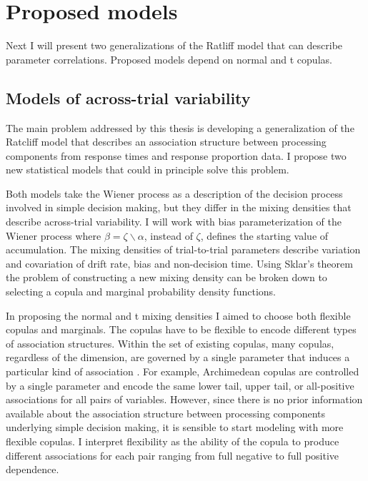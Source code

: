 \documentclass[12pt]{article}
\begin{document}
\section{Proposed models}

Next I will present two generalizations of the Ratliff model that can describe parameter correlations. Proposed models depend on normal and t copulas. 
\subsection{Models of across-trial variability}

The main problem addressed by this thesis is developing a generalization of the Ratcliff model that describes an association
structure between processing components from response times and
response proportion data. I propose two new statistical models that
could in principle solve this problem.

Both models take the Wiener process as a description of the decision
process involved in simple decision making, but they differ in the
mixing densities that describe across-trial variability. I will work
with bias parameterization of the Wiener process where $\beta = \zeta \backslash \alpha$, instead of $\zeta$, defines the starting value of accumulation. The
mixing densities of trial-to-trial parameters describe variation and covariation of drift rate, bias and non-decision time. Using Sklar's theorem the problem of
constructing a new mixing density can be broken down to
selecting a copula and marginal probability density functions.
    
In proposing the normal and t mixing densities I aimed to choose
both flexible copulas and marginals. 
The copulas have to be flexible to encode different types of
association structures. Within the set of existing copulas, many
copulas, regardless of the dimension, are governed by a single
parameter that induces a particular kind of association
\citep{Joe1997,Nel2007}. For example, Archimedean copulas are
controlled by a single parameter and encode the same lower tail,
upper tail, or all-positive associations for all
pairs of variables. However, since there is no prior information
available about the association structure between processing
components underlying simple decision making, it is sensible to start
modeling with more flexible copulas. I interpret flexibility as
the ability of the copula to produce different associations
for each pair ranging from full negative to full positive dependence.
    
\end{document}
